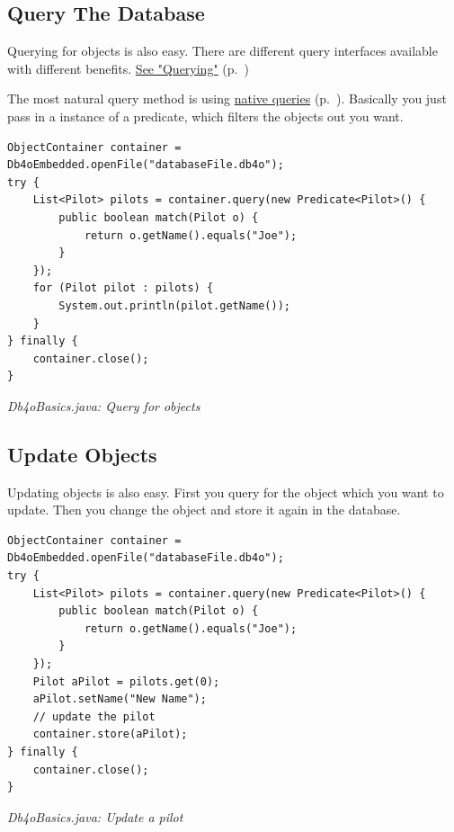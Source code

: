 \subsection{Query The Database}
\label{ref:basics-object-container:queries}

Querying for objects is also easy. There are different query interfaces available with different benefits. \hyperref[ref:basics-querying]{See "Querying"} (p.~\pageref{ref:basics-querying})

The most natural query method is using \hyperref[ref:basics-querying-native-queries]{native queries} (p.~\pageref{ref:basics-querying-native-queries}). Basically you just pass in a instance of a predicate, which filters the objects out you want.

\begin{lstlisting}
ObjectContainer container = Db4oEmbedded.openFile("databaseFile.db4o");
try {
    List<Pilot> pilots = container.query(new Predicate<Pilot>() {
        public boolean match(Pilot o) {
            return o.getName().equals("Joe");
        }
    });
    for (Pilot pilot : pilots) {
        System.out.println(pilot.getName());
    }
} finally {
    container.close();
}
\end{lstlisting}

{\small\itshape Db4oBasics.java: Query for objects\par}
\medskip

\subsection{Update Objects}
\label{ref:basics-object-container:updateobjects}

Updating objects is also easy. First you query for the object which you want to update. Then you change the object and store it again in the database.

\begin{lstlisting}
ObjectContainer container = Db4oEmbedded.openFile("databaseFile.db4o");
try {
    List<Pilot> pilots = container.query(new Predicate<Pilot>() {
        public boolean match(Pilot o) {
            return o.getName().equals("Joe");
        }
    });
    Pilot aPilot = pilots.get(0);
    aPilot.setName("New Name");
    // update the pilot
    container.store(aPilot);
} finally {
    container.close();
}
\end{lstlisting}

{\small\itshape Db4oBasics.java: Update a pilot\par}
\medskip


